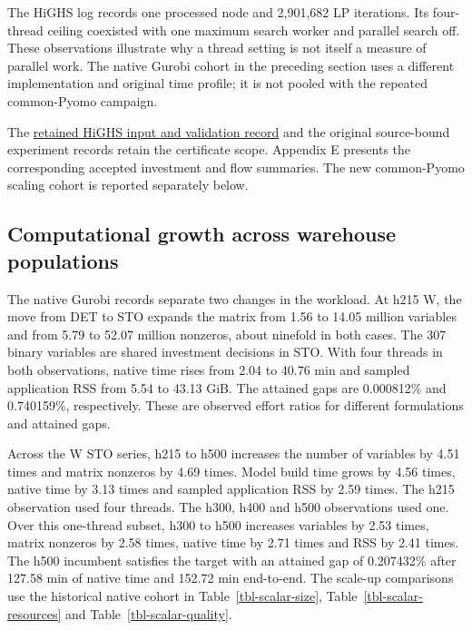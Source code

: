 \documentclass[
  english,
  11pt,
  a4paper,
  authoryear,
  preprint]{elsarticle}
\begin{document}
The HiGHS log records one processed node and 2,901,682 LP iterations.
Its four-thread ceiling coexisted with one maximum search worker and
parallel search off. These observations illustrate why a thread setting
is not itself a measure of parallel work. The native Gurobi cohort in
the preceding section uses a different implementation and original time
profile; it is not pooled with the repeated common-Pyomo campaign.

The
\href{https://github.com/unb-lamfo-or-ai-hpc/model-agrologistic/blob/ad2ded8132bf5171be65c0113b3d0026c22b2e7b/docs/evidence/scalar_highs_h215_2226536_inspection.json}{retained
HiGHS input and validation record} and the original source-bound
experiment records retain the certificate scope. Appendix E presents the
corresponding accepted investment and flow summaries. The new
common-Pyomo scaling cohort is reported separately below.

\subsection{Computational growth across warehouse
populations}\label{computational-growth-across-warehouse-populations}

The native Gurobi records separate two changes in the workload. At h215
W, the move from DET to STO expands the matrix from 1.56 to 14.05
million variables and from 5.79 to 52.07 million nonzeros, about
ninefold in both cases. The 307 binary variables are shared investment
decisions in STO. With four threads in both observations, native time
rises from 2.04 to 40.76 min and sampled application RSS from 5.54 to
43.13 GiB. The attained gaps are 0.000812\% and 0.740159\%,
respectively. These are observed effort ratios for different
formulations and attained gaps.

Across the W STO series, h215 to h500 increases the number of variables
by 4.51 times and matrix nonzeros by 4.69 times. Model build time grows
by 4.56 times, native time by 3.13 times and sampled application RSS by
2.59 times. The h215 observation used four threads. The h300, h400 and
h500 observations used one. Over this one-thread subset, h300 to h500
increases variables by 2.53 times, matrix nonzeros by 2.58 times, native
time by 2.71 times and RSS by 2.41 times. The h500 incumbent satisfies
the target with an attained gap of 0.207432\% after 127.58 min of native
time and 152.72 min end-to-end. The scale-up comparisons use the
historical native cohort in Table~\ref{tbl-scalar-size},
Table~\ref{tbl-scalar-resources} and Table~\ref{tbl-scalar-quality}.
\end{document}
